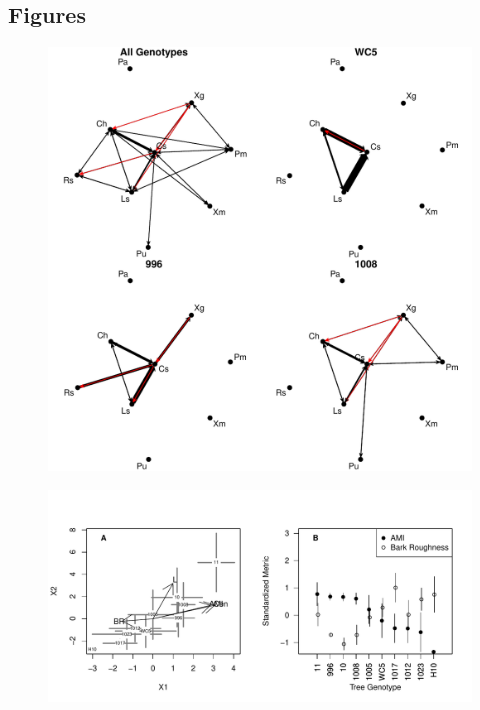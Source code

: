 \documentclass[11pt,twocolumn,twoside,lineno]{pnas-new}
\begin{document}
\newpage





\newpage

\subsection*{Figures}

\newpage

\begin{figure}[ht]
\centering
\includegraphics[width=\linewidth]{cn_onc.pdf}
\caption{}
\label{fig:}
\end{figure}

\begin{figure}[ht]
\centering
\includegraphics[width=\linewidth]{h2_plot.pdf}
\caption{}
\label{fig:}
\end{figure}
\end{document}
